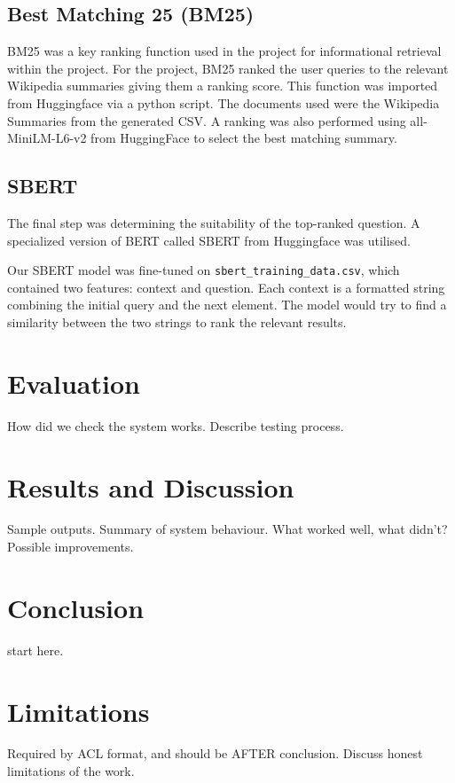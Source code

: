 \documentclass[11pt]{article}
\begin{document}
\subsection{Best Matching 25 (BM25)}
BM25 was a key ranking function used in the project for informational retrieval within the project. For the project, BM25 ranked the user queries to the relevant Wikipedia summaries giving them a ranking score. This function was imported from Huggingface via a python script. 
 \newline
 \newline
The documents used were the Wikipedia Summaries from the generated CSV. A ranking was also performed using all-MiniLM-L6-v2 from HuggingFace to select the best matching summary.


\subsection{SBERT}
The final step was determining the suitability of the top-ranked question. A specialized version of BERT called SBERT from Huggingface was utilised.

Our SBERT model was fine-tuned on \texttt{sbert\_training\_data.csv}, which contained two features: context and question. Each context is a formatted string combining the initial query and the next element. The model would try to find a similarity between the two strings to rank the relevant results.





\section{Evaluation}
How did we check the system works.
Describe testing process.

\section{Results and Discussion}
Sample outputs.
Summary of system behaviour.
What worked well, what didn't?
Possible improvements.

\section{Conclusion}
start here.

\section*{Limitations}
Required by ACL format, and should be AFTER conclusion.
Discuss honest limitations of the work.
\end{document}
